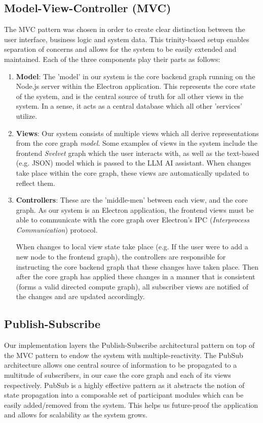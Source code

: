 \documentclass[11pt,a4paper]{article}
\begin{document}
\subsection{Model-View-Controller (MVC)}
The MVC pattern was chosen in order to create clear distinction between the user
interface, business logic and system data. This trinity-based setup enables
separation of concerns and allows for the system to be easily extended and
maintained. Each of the three components play their parts as follows:
\begin{enumerate}[label*=\arabic*.]
	\item[\textbullet] {\bf Model}: The 'model' in our system is the core
	backend graph running on the Node.js server within the Electron application.
	This represents the core state of the system, and is the central source of
	truth for all other views in the system. In a sense, it acts as a central
	database which all other 'services' utilize.
	\item[\textbullet] {\bf Views}: Our system consists of multiple views which
	all derive representations from the core graph {\it model}. Some examples of
	views in the system include the frontend {\it Svelvet} graph which the user
	interacts with, as well as the text-based (e.g. JSON) model which is passed
	to the LLM AI assistant. When changes take place within the core graph,
	these views are automatically updated to reflect them.
	\item[\textbullet] {\bf Controllers}: These are the 'middle-men' between
	each view, and the core graph. As our system is an Electron application, the
	frontend views must be able to communicate with the core graph over
	Electron's IPC ({\it Interprocess Communication}) protocol.

	When changes to local view state take place (e.g. If the user were to add a
	new node to the frontend graph), the controllers are responsible for
	instructing the core backend graph that these changes have taken place. Then
	after the core graph has applied these changes in a manner that is
	consistent (forms a valid directed compute graph), all subscriber views are
	notified of the changes and are updated accordingly.
\end{enumerate}


\subsection{Publish-Subscribe}
Our implementation layers the Publish-Subscribe architectural pattern on top of
the MVC pattern to endow the system with multiple-reactivity. The PubSub
architecture allows one central source of information to be propagated to a
multitude of subscribers, in our case the core graph and each of its views
respectively. PubSub is a highly effective pattern as it abstracts the notion of
state propagation into a composable set of participant modules which can be
easily added/removed from the system. This helps us future-proof the application
and allows for scalability as the system grows.
\end{document}
